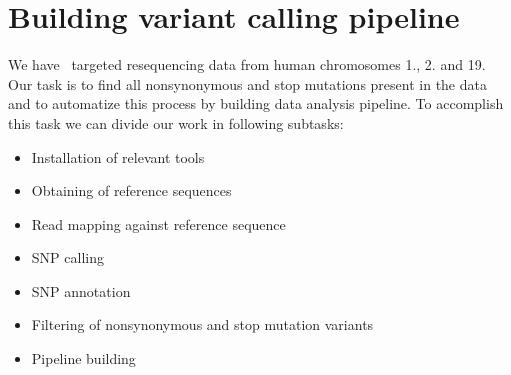 \section{Building variant calling pipeline}
We have \IonTorrent~targeted resequencing data from human chromosomes 1., 2. and 19. 
Our task is to find all nonsynonymous and stop mutations present in the data
and to automatize this process by building data analysis pipeline.
To accomplish this task we can divide our work in following subtasks:
\begin{itemize}
  \item Installation of relevant tools
  \item Obtaining of reference sequences
  \item Read mapping against reference sequence
  \item SNP calling
  \item SNP annotation
  \item Filtering of nonsynonymous and stop mutation variants
  \item Pipeline building
\end{itemize}





